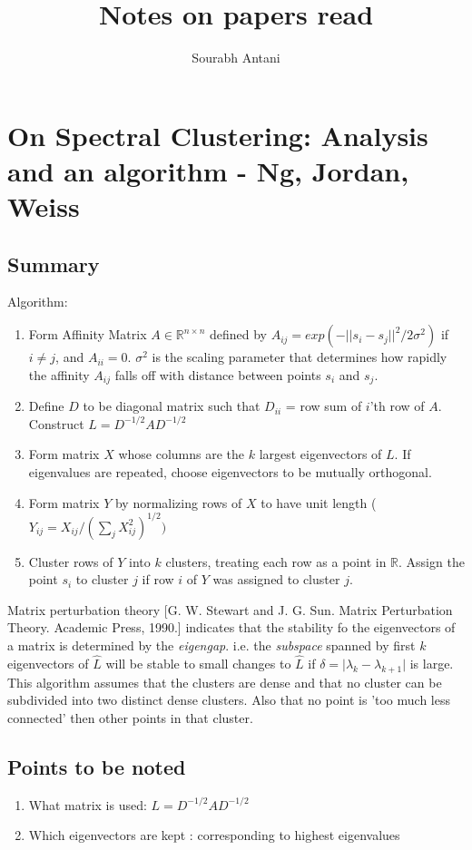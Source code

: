 \documentclass[10pt,a4paper,twoside]{report}
\author{Sourabh Antani}
\title{Notes on papers read}
\date{}
\theoremstyle{definition}
\newcommand{\abs}[1]{\lvert {#1} \rvert}
\newcommand{\norm}[1]{\lvert\lvert {#1} \rvert\rvert}
\begin{document}
	\maketitle

	\thispagestyle{fancy}
	
	\chapter*{On Spectral Clustering: Analysis and an algorithm - Ng, Jordan, Weiss}
	\section*{Summary}
	Algorithm:
	\begin{enumerate}
		\item Form Affinity Matrix $A \in \mathbb{R}^{n\times n}$ defined by $A_{ij} = exp(-\norm{s_i - s_j}^2/2\sigma^2)$ if $i \ne j$, and $A_{ii} = 0$. $\sigma^2$ is the scaling parameter that determines how rapidly the affinity $A_{ij}$ falls off with distance between points $s_i$ and $s_j$.
		\item Define $D$ to be diagonal matrix such that $D_{ii}$ = row sum of $i$'th row of $A$. Construct $L = D^{-1/2}AD^{-1/2}$
		\item Form matrix $X$ whose columns are the $k$ largest eigenvectors of $L$. If eigenvalues are repeated, choose eigenvectors to be mutually orthogonal. 
		\item Form matrix $Y$ by normalizing rows of $X$ to have unit length ($Y_{ij} = X_{ij}/(\sum_{j}X_{ij}^2)^{1/2})$
		\item Cluster rows of $Y$ into $k$ clusters, treating each row as a point in $\mathbb{R}$. Assign the point $s_i$ to cluster $j$ if row $i$ of $Y$ was assigned to cluster $j$.
	\end{enumerate}

	Matrix perturbation theory [G. W. Stewart and J. G. Sun. Matrix Perturbation Theory. Academic Press, 1990.] indicates that the stability fo the eigenvectors of a matrix is determined by the \textit{eigengap}. i.e. the \textit{subspace} spanned by first $k$ eigenvectors of $\hat{L}$ will be stable to small changes to $\hat{L}$ if $\delta = \abs{\lambda_k - \lambda_{k+1}}$ is large. This algorithm assumes that the clusters are dense and that no cluster can be subdivided into two distinct dense clusters. Also that no point is 'too much less connected' then other points in that cluster. 

	
	\section*{Points to be noted}
	\begin{enumerate}
		\item What matrix is used: $L = D^{-1/2}AD^{-1/2}$
		\item Which eigenvectors are kept : corresponding to highest eigenvalues
		
	\end{enumerate}
	
\end{document}
